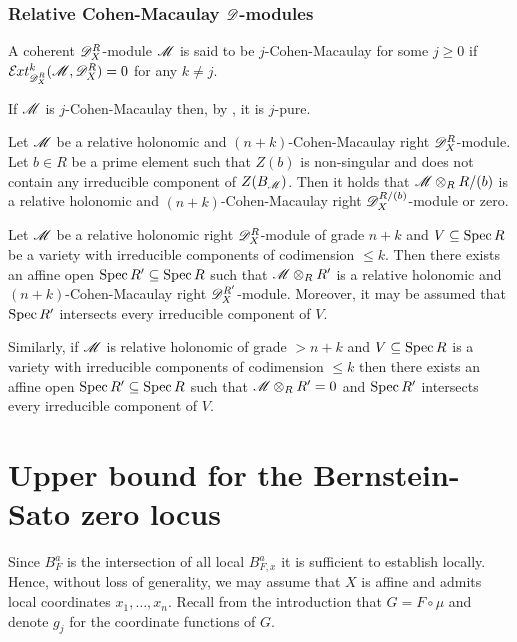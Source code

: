 \subsubsection{Relative Cohen-Macaulay $\mathscr{D}$-modules}
 \begin{definition}
   A coherent $\mathscr{D}_X^R$-module $\mathscr{M}$ is said to be $j$-Cohen-Macaulay for some $j\geq 0$ if $\Ex{\D_X^R}{k}(\M,\D_X^R) = 0$ for any $k\neq j$.
 \end{definition}
 \begin{remark}
  If $\mathscr{M}$ is $j$-Cohen-Macaulay then, by , it is $j$-pure.
 \end{remark}
 \begin{proposition}{\cite[Proof of Proposition 3.4.3]{budur2020zeroI}}\label{prop: CMRestriction}
   Let $\mathscr{M}$ be a relative holonomic and $(n+k)$-Cohen-Macaulay right $\mathscr{D}_X^R$-module. Let $b\in R$ be a prime element such that $Z(b)$ is non-singular and does not contain any irreducible component of $Z(B_{\mathscr{M}})$. Then it holds that $\mathscr{M}\otimes_R R/(b)$ is a relative holonomic and $(n+k)$-Cohen-Macaulay right $\mathscr{D}_X^{R/(b)}$-module or zero.
 \end{proposition}
 \begin{proposition}{\cite[Proof of Proposition 3.5.2]{budur2020zeroI}}\label{prop: RestrictToCM}
   Let $\mathscr{M}$ be a relative holonomic right $\mathscr{D}_X^R$-module of grade $n+k$ and $V\subseteq \operatorname{Spec} R$ be a variety with irreducible components of codimension $\leq k$.
   Then there exists an affine open $\operatorname{Spec} R' \subseteq \operatorname{Spec} R$ such that $\mathscr{M}\otimes_R R'$ is a relative holonomic and $(n+k)$-Cohen-Macaulay right $\mathscr{D}_X^{R'}$-module.
    Moreover, it may be assumed that $\operatorname{Spec} R'$ intersects every irreducible component of $V$.

    Similarly, if $\mathscr{M}$ is relative holonomic of grade $>n+k$ and $V\subseteq \operatorname{Spec} R$ is a variety with irreducible components of codimension $\leq k$ then there exists an affine open $\operatorname{Spec} R'\subseteq \operatorname{Spec} R$ such that $\mathscr{M}\otimes_R R' = 0$ and $\operatorname{Spec} R'$ intersects every irreducible component of $V$.
 \end{proposition}

 \section{Upper bound for the Bernstein-Sato zero locus}\label{sec: UpperBound}
 Since $B_F^a$ is the intersection of all local $B_{F,x}^a$ it is sufficient to establish  locally.
 Hence, without loss of generality, we may assume that $X$ is affine and admits local coordinates $x_1,\ldots, x_n$.
 Recall from the introduction that $G = F\circ\mu$ and denote $g_j$ for the coordinate functions of $G$.
